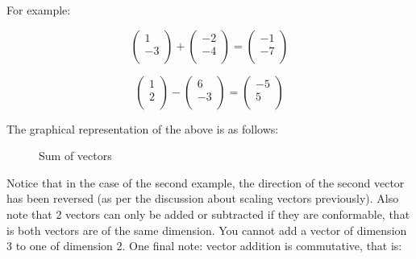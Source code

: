 \documentclass[a4paper,oneside]{report}
\begin{document}
For example:

\[ \begin{pmatrix}
	1 \\
	-3 \\
\end{pmatrix} +
\begin{pmatrix}
	-2 \\
	-4 \\
\end{pmatrix} = \begin{pmatrix}
	-1 \\
	-7 \\
\end{pmatrix} \]

\[ \begin{pmatrix}
	1 \\
	2 \\
\end{pmatrix} -
\begin{pmatrix}
	6 \\
	-3 \\
\end{pmatrix} = \begin{pmatrix}
	-5 \\
	5 \\
\end{pmatrix} \]

The graphical representation of the above is as follows:

\begin{figure}[h]
	\centering

	Sum of vectors
\end{figure}

Notice that in the case of the second example, the direction of the second
vector has been reversed (as per the discussion about scaling vectors
previously). Also note that 2 vectors can only be added or subtracted if they
are conformable, that is both vectors are of the same dimension. You cannot
add a vector of dimension 3 to one of dimension 2. One final note: vector
addition is commutative, that is:
\end{document}
